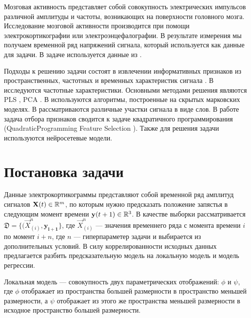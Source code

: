 \documentclass[12pt, twoside]{article}
\begin{document}
Мозговая активность представляет собой совокупность электрических импульсов различной амплитуды и частоты, возникающих на поверхности головного мозга. Исследование мозговой активности производится при помощи  электрокортикографии \cite{hill2012recording} или \cite{aminoff2012electroencephalography} электроэнцефалографии. В результате измерения мы получаем временной ряд напряжений сигнала, который используется как данные для задачи. В задаче используется данные из \cite{chao2010long}.

 Подходы \cite{morishita2014brain, alexander2013traveling} к решению задачи состоят в извлечении информативных признаков из пространственных, частотных и временных характеристик сигнала . 
В \cite{chin2007identification, eliseyev2014stable, loza2017unsupervised} исследуются частотные характеристики. Основными методами решения являются PLS \cite{eliseyev2014stable,eliseyev2016penalized, rosipal2005overview}, PCA \cite{rosipal2005overview, eliseyev2016penalized}. В \cite{zhao2014coupled} используются алгоритмы, построенные на скрытых марковских моделях. В \cite{loza2017unsupervised, zhao2010ecog} рассматриваются различные участки сигнала в виде слов. В работе \cite{motrenko2018multi} задача отбора признаков сводится к задаче квадратичного программирования (QuadraticProgramming Feature Selection \cite{rodriguez2010quadratic}). Также для решения задачи используются нейросетевые модели\cite{xie2018deep}. 
\newpage
\section{Постановка задачи}
Данные электрокортикограммы представляют собой временной ряд амплитуд сигналов $\mathbf{X}(t)  \in \mathbb{R}^{m}$, по которым нужно предсказать положение запястья в следующим момент времени $\mathbf{y}(t+1) \in \mathbb{R}^3$. В качестве выборки рассматривается $\mathfrak{D} = \{(\vec{X}_{(i)}^n, \mathbf{y_{i+1}}\}$, где $\vec{X}_{(i)}^n$ --- значения временнего ряда с момента времени $i$ по момент $i + n$, где $n$ --- гиперпараметер задачи и выбирается из дополнительных условий. В силу коррелированности исходных данных предлагается разбить предсказательную модель на локальную модель и модель регрессии.

\begin{Def}
	Локальная модель --- совокупность двух параметрических отображений: $\phi$ и $\psi$, где 
	$\phi$ отображает из пространства большей размерности в пространство меньшей размерности, а $\psi$ отображает из этого же пространства меньшей размерности в исходное пространство большей размерности.
\end{Def}
\end{document}
